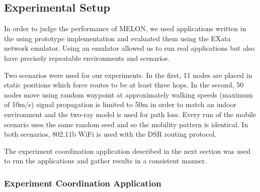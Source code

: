 \documentclass[lnicst]{svmultln}
\begin{document}
\subsection{Experimental Setup}

In order to judge the performance of MELON, we used applications written in the using prototype implementation and evaluated them using the EXata network emulator\cite{exata}. Using an emulator allowed us to run real applications but also have precisely repeatable environments and scenarios.

Two scenarios were used for our experiments. In the first, 11 nodes are placed in static positions which force routes to be at least three hops. In the second, 50 nodes move using random waypoint at approximately walking speeds (maximum of 10m/s) signal propagation is limited to 50m in order to match an indoor environment and the two-ray model is used for path loss. Every run of the mobile scenario uses the same random seed and so the mobility pattern is identical. In both scenarios, 802.11b WiFi is used with the DSR\cite{dsr} routing protocol.

The experiment coordination application described in the next section was used to run the applications and gather results in a consistent manner.

\subsubsection{Experiment Coordination Application}
\end{document}
